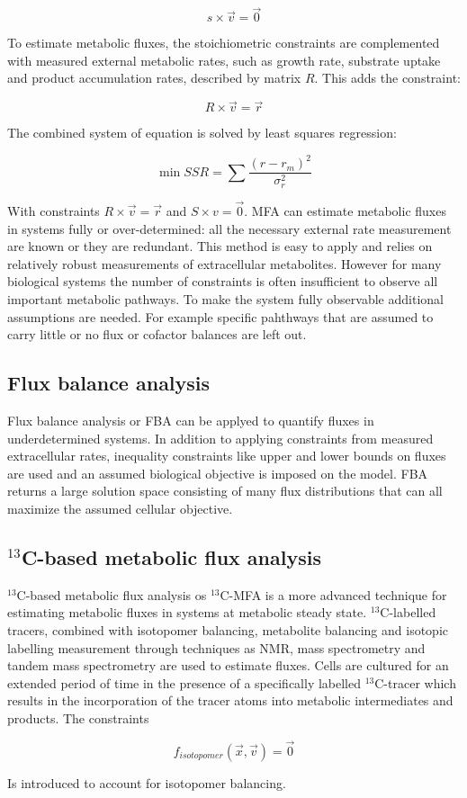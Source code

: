 	$$s\times\vec{v} = \vec{0}$$

	To estimate metabolic fluxes, the stoichiometric constraints are complemented with measured external metabolic rates, such as growth rate, substrate uptake and product accumulation rates, described by matrix $R$.
	This adds the constraint:

	$$R\times\vec{v}=\vec{r}$$

	The combined system of equation is solved by least squares regression:

	$$\min SSR = \sum\frac{(r-r_m)^2}{\sigma_r^2}$$

	With constraints $R\times\vec{v}=\vec{r}$ and $S\times v = \vec{0}$.
	MFA can estimate metabolic fluxes in systems fully or over-determined: all the necessary external rate measurement are known or they are redundant.
	This method is easy to apply and relies on relatively robust measurements of extracellular metabolites.
	However for many biological systems the number of constraints is often insufficient to observe all important metabolic pathways.
	To make the system fully observable additional assumptions are needed.
	For example specific pahthways that are assumed to carry little or no flux or cofactor balances are left out.

	\subsection{Flux balance analysis}
	Flux balance analysis or FBA can be applyed to quantify fluxes in underdetermined systems.
	In addition to applying constraints from measured extracellular rates, inequality constraints like upper and lower bounds on fluxes are used and an assumed biological objective is imposed on the model.
	FBA returns a large solution space consisting of many flux distributions that can all maximize the assumed cellular objective.

	\subsection{$^{13}$C-based metabolic flux analysis}
	$^{13}$C-based metabolic flux analysis os $^{13}$C-MFA is a more advanced technique for estimating metabolic fluxes in systems at metabolic steady state.
	$^{13}$C-labelled tracers, combined with isotopomer balancing, metabolite balancing and isotopic labelling measurement through techniques as NMR, mass spectrometry and tandem mass spectrometry are used to estimate fluxes.
	Cells are cultured for an extended period of time in the presence of a specifically labelled $^{13}$C-tracer which results in the incorporation of the tracer atoms into metabolic intermediates and products.
	The constraints

	$$f_{isotopomer}(\vec{x},\vec{v}) = \vec{0}$$

	Is introduced to account for isotopomer balancing.
